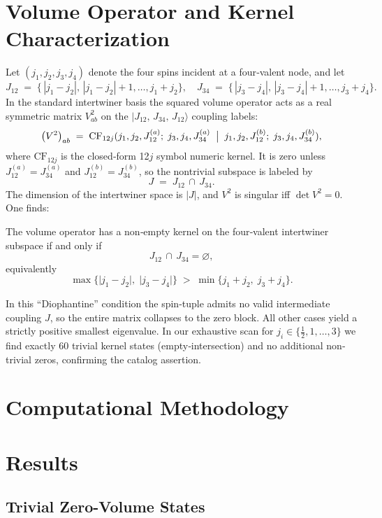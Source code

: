 \documentclass[11pt]{article}
\begin{document}
\section{Volume Operator and Kernel Characterization}
Let $(j_1,j_2,j_3,j_4)$ denote the four spins incident at a four‐valent node, and let
\[
J_{12}\;=\;\{\,|j_1-j_2|,\,|j_1-j_2|+1,\dots,j_1+j_2\},\quad
J_{34}\;=\;\{\,|j_3-j_4|,\,|j_3-j_4|+1,\dots,j_3+j_4\}.
\]
In the standard intertwiner basis the squared volume operator acts as a real symmetric matrix $V^2_{ab}$ on the $|J_{12},\,J_{34},\,J_{12}\rangle$ coupling labels:
\[
\bigl(V^2\bigr)_{ab}
\;=\;
\mathrm{CF}_{12j}(j_1,j_2,J_{12}^{(a)};\;j_3,j_4,J_{34}^{(a)}\;\bigm|\;
j_1,j_2,J_{12}^{(b)};\;j_3,j_4,J_{34}^{(b)}),
\]
where $\mathrm{CF}_{12j}$ is the closed‐form 12$j$ symbol numeric kernel.  It is zero unless $J_{12}^{(a)}=J_{34}^{(a)}$ and $J_{12}^{(b)}=J_{34}^{(b)}$, so the nontrivial subspace is labeled by
\[
J\;=\;J_{12}\,\cap\,J_{34}.
\]
The dimension of the intertwiner space is $|J|$, and $V^2$ is singular iff $\det V^2=0$.  One finds:

\begin{proposition}
The volume operator has a non‐empty kernel on the four‐valent intertwiner subspace if and only if
\[
J_{12}\,\cap\,J_{34}=\varnothing,
\]
equivalently
\[
\max\{\lvert j_1-j_2\rvert,\;\lvert j_3-j_4\rvert\}
\;>\;
\min\{j_1+j_2,\;j_3+j_4\}.
\]
\end{proposition}

\noindent
In this “Diophantine” condition the spin‐tuple admits no valid intermediate coupling $J$, so the entire matrix collapses to the zero block.  All other cases yield a strictly positive smallest eigenvalue.  In our exhaustive scan for $j_i\in\{\tfrac12,1,\dots,3\}$ we find exactly 60 trivial kernel states (empty‐intersection) and no additional non‐trivial zeros, confirming the catalog assertion.

\section{Computational Methodology}

\section{Results}
\subsection{Trivial Zero-Volume States}
\begin{table}[ht]
\centering
\caption{List of trivial zero-volume 4-valent spin configurations ($J_{12}\cap J_{34}=\emptyset$).}
\label{tab:trivial_zero_volume}
\end{table}
\end{document}
